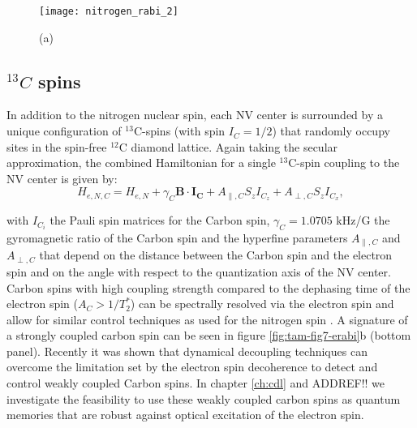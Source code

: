 \begin{figure*}
	\centering
	\texttt{[image: nitrogen\_rabi\_2]}
	\caption{\label{fig:tam-fig10-nrabi} \textbf{} (a) }
\end{figure*}

\subsection{$^{13}C$ spins}
In addition to the nitrogen nuclear spin, each NV center is surrounded by a unique configuration of $^{13}$C-spins (with spin $I_C = 1/2$) that randomly occupy sites in the spin-free $^{12}$C diamond lattice. Again taking the secular approximation, the combined Hamiltonian for a single $^{13}$C-spin coupling to the NV center is given by:
\begin{equation}
H_{e,N,C} = H_{e,N} + \gamma_C \mathbf{B} \cdot \mathbf{I_C} + A_{\parallel,C} S_z I_{C_z} + A_{\perp,C} S_z I_{C_x},
\end{equation}

with $I_{C_i}$ the Pauli spin matrices for the Carbon spin, $\gamma_C = 1.0705$ kHz/G the gyromagnetic ratio of the Carbon spin and the hyperfine parameters $A_{\parallel,C}$ and $A_{\perp,C}$ that depend on the distance between the Carbon spin and the electron spin and on the angle with respect to the quantization axis of the NV center. Carbon spins with high coupling strength compared to the dephasing time of the electron spin ($A_C > 1/T_2^*$) can be spectrally resolved via the electron spin and allow for similar control techniques as used for the nitrogen spin \cite{Jelezko_Phys.Rev.Lett._2004,Dutt_Science_2007,Neumann_Science_2008,Jiang_Science_2009,Smeltzer_Phys.Rev.A_2009}. A signature of a strongly coupled carbon spin can be seen in figure \ref{fig:tam-fig7-erabi}b (bottom panel). Recently it was shown that dynamical decoupling techniques can overcome the limitation set by the electron spin decoherence to detect\cite{Taminiau_Phys.Rev.Lett._2012,Kolkowitz_Phys.Rev.Lett._2012,Zhao_NatNano_2012} and control\cite{Taminiau_NatNano_2014} weakly coupled Carbon spins. In chapter \ref{ch:cdl} and ADDREF!! we investigate the feasibility to use these weakly coupled carbon spins as quantum memories that are robust against optical excitation of the electron spin.




\newpage





